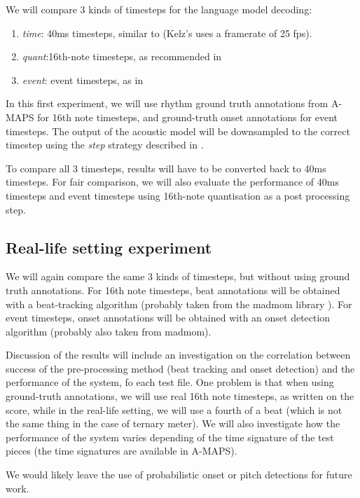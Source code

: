 \documentclass{article}
\begin{document}
We will compare 3 kinds of timesteps for the language model decoding:

\begin{enumerate}
\item \emph{time}: 40ms timesteps, similar to \citep{sigtia2016end} (Kelz's uses a framerate of 25 fps).
\item \emph{quant}:16th-note timesteps, as recommended in \citep{Ycart2017}
\item \emph{event}: event timesteps, as in \citep{app8030470}
\end{enumerate}

In this first experiment, we will use rhythm ground truth annotations from A-MAPS for 16th note timesteps, and ground-truth onset annotations for event timesteps.
The output of the acoustic model will be downsampled to the correct timestep using the \emph{step}
strategy described in \citep{ycart2018polyphonic}.

To compare all 3 timesteps, results will have to be converted back to 40ms timesteps.
For fair comparison, we will also evaluate the performance of 40ms timesteps and event timesteps using 16th-note quantisation as a post processing step.

\subsection{Real-life setting experiment}

We will again compare the same 3 kinds of timesteps, but without using ground truth annotations.
For 16th note timesteps, beat annotations will be obtained with a beat-tracking algorithm (probably taken from the madmom library \citep{madmom}).
For event timesteps, onset annotations will be obtained with an onset detection algorithm (probably also taken from madmom).

Discussion of the results will include an investigation on the correlation between success of the pre-processing method (beat tracking and onset detection) and the performance of the system, fo each test file.
One problem is that when using ground-truth annotations, we will use real 16th note timesteps, as written on the score, while in the real-life setting, we will use a fourth of a beat (which is not the same thing in the case of ternary meter).
We will also investigate how the performance of the system varies depending of the time signature of the test pieces (the time signatures are available in A-MAPS).

We would likely leave the use of probabilistic onset or pitch detections for future work.
\end{document}
